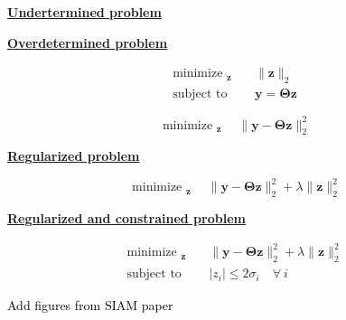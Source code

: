 \documentclass[aspectratio=169, usenames, dvipsnames]{beamer}
\DeclareMathOperator*{\minimize}{minimize~}
\DeclareMathOperator*{\subto}{subject~to~}
\begin{document}
\begin{frame}
  \vfill
  \begin{minipage}{.48\textwidth}
    \centering
    \underline{\textbf{Undertermined problem}}
  \end{minipage}%
  \hfill
  \begin{minipage}{.48\textwidth}
    \centering
    \underline{\textbf{Overdetermined problem}}
  \end{minipage}

  \bigskip

  \begin{minipage}{.48\textwidth}
    \large
    \[
    \begin{aligned}
      \minimize_{\bm{z}} & \quad \| \bm{z} \|_2 \\
      \subto & \quad \bm{y} = \boldsymbol{\Theta} \bm{z}
    \end{aligned}
    \]
  \end{minipage}%
  \hfill
  \begin{minipage}{.48\textwidth}
    \large
    \[
    \minimize_{\bm{z}} \quad \| \bm{y} - \boldsymbol{\Theta} \bm{z} \|_2^2
    \]
  \end{minipage}

  \vfill
\end{frame}

\begin{frame}
  \vfill
  \centering
  \underline{\textbf{Regularized problem}}


  \large
  \[
  \minimize_{\bm{z}} \quad \| \bm{y} - \boldsymbol{\Theta} \bm{z} \|_2^2 + \lambda \| \bm{z} \|_2^2
  \]
  \vfill
\end{frame}

\begin{frame}
  \vfill
  \centering
  \underline{\textbf{Regularized and constrained problem}}


  \large
  \[
  \begin{aligned}
    \minimize_{\bm{z}} & \quad \| \bm{y} - \boldsymbol{\Theta} \bm{z} \|_2^2 + \lambda \| \bm{z} \|_2^2 \\
    \subto & \quad \vert z_i \vert \leq 2 \sigma_i \quad \forall \ i
  \end{aligned}
  \]
  \vfill
\end{frame}

{

\begin{frame}
  \textcolor{black}{Add figures from SIAM paper}
\end{frame}
}
\end{document}
